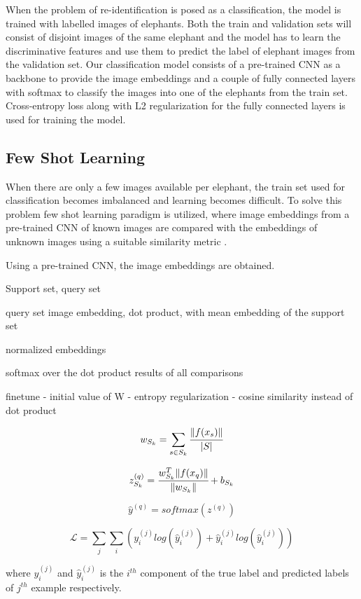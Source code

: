 \documentclass[10pt,twocolumn,letterpaper]{article}
\begin{document}
When the problem of re-identification is posed as a classification, the model is trained with labelled images of elephants. Both the train and validation sets will consist of disjoint images of the same elephant and the model has to learn the discriminative features and use them to predict the label of elephant images from the validation set. Our classification model consists of a pre-trained CNN as a backbone to provide the image embeddings and a couple of fully connected layers with softmax to classify the images into one of the elephants from the train set. Cross-entropy loss along with L2 regularization for the fully connected layers is used for training the model.


\subsection{Few Shot Learning}

When there are only a few images available per elephant, the train set used for classification becomes imbalanced and learning becomes difficult. To solve this problem few shot learning paradigm is utilized, where image embeddings from a pre-trained CNN of known images are compared with the embeddings of unknown images using a suitable similarity metric \cite{fewshotclassification}. 

Using a pre-trained CNN, the image embeddings are obtained. 

Support set, query set

query set image embedding, dot product, with mean embedding of the support set

normalized embeddings

softmax over the dot product results of all comparisons

finetune
- initial value of W
- entropy regularization
- cosine similarity instead of dot product

$$
w_{S_k} = \sum_{s \in S_k} \cfrac{ \lVert f(x_s) \rVert}{  | S | }
$$

$$
z_{S_k}^{(q)} = \cfrac{w_{S_k}^T \lVert f(x_q) \rVert}{\lVert w_{S_k} \rVert} + b_{S_k}
$$

$$
\hat{y}^{(q)} = softmax(z^{(q)})
$$

$$
\mathcal{L} = \sum_{j}\sum_{i} (y_i^{(j)} log(\hat{y}_i^{(j)}) + \hat{y}_i^{(j)} log({\hat{y}_i^{(j)}}))
$$

where $y_i^{(j)}$ and $\hat{y}_i^{(j)}$ is the $i^{th}$ component of the true label and predicted labels of $j^{th}$ example respectively.
\end{document}
